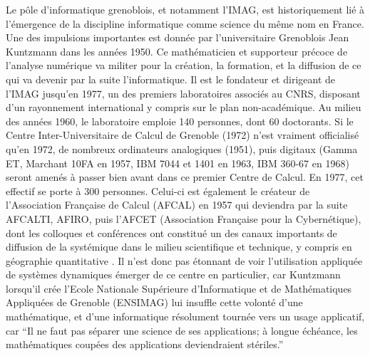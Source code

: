 Le pôle d'informatique grenoblois, et notamment l'IMAG, est historiquement lié à l'émergence de la discipline informatique comme science du même nom en France. Une des impulsions importantes est donnée par l'universitaire Grenoblois Jean Kuntzmann dans les années 1950. Ce mathématicien et supporteur précoce de l'analyse numérique va militer pour la création, la formation, et la diffusion de ce qui va devenir par la suite l'informatique. Il est le fondateur et dirigeant de l'IMAG jusqu'en 1977, un des premiers laboratoires associés au CNRS, disposant d'un rayonnement international y compris sur le plan non-académique. Au milieu des années 1960, le laboratoire emploie 140 personnes, dont 60 doctorants. Si le Centre Inter-Universitaire de Calcul de Grenoble (1972) n'est vraiment officialisé qu'en 1972, de nombreux ordinateurs analogiques (1951), puis digitaux (Gamma ET, Marchant 10FA en 1957, IBM 7044 et 1401 en 1963, IBM 360-67 en 1968) seront amenés à passer bien avant dans ce premier Centre de Calcul. En 1977, cet effectif se porte à 300 personnes. Celui-ci est également le créateur de l'Association Française de Calcul (AFCAL) en 1957 qui deviendra par la suite AFCALTI, AFIRO, puis l'AFCET (Association Française pour la Cybernétique), dont les colloques et conférences ont constitué un des canaux importants de diffusion de la systémique dans le milieu scientifique et technique, y compris en géographie quantitative \autocite{Pumain2003}. Il n'est donc pas étonnant de voir l'utilisation appliquée de systèmes dynamiques émerger de ce centre en particulier, car Kuntzmann lorsqu'il crée l'Ecole Nationale Supérieure d'Informatique et de Mathématiques Appliquées de Grenoble (ENSIMAG) lui insuffle cette volonté d'une mathématique, et d'une informatique résolument tournée vers un usage applicatif, car \enquote{Il ne faut pas séparer une science de ses applications; à longue échéance, les mathématiques coupées des applications deviendraient stériles.} \autocites[422]{Mounier2012}{Chiffres1977}

